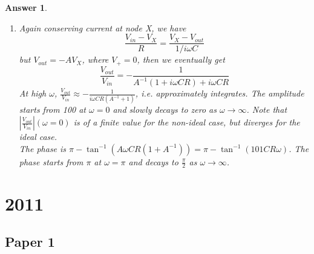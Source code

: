 \documentclass[a4paper]{article}
\newtheorem{ans}{Answer}[subsection]
\theoremstyle{new}
\begin{document}
\begin{ans}
\begin{enumerate}[label=(\roman*)]
\item Again conserving current at node X, we have 
$$\frac{V_{in}-V_X}{R}=\frac{V_X-V_{out}}{1/i\omega C}$$
but $V_{out}=-AV_X$, where $V_+=0$, then we eventually get 
$$\frac{V_{out}}{V_{in}}=-\frac{1}{A^{-1}(1+i\omega CR)+i\omega CR}$$
At high $\omega$, $\frac{V_{out}}{V_{in}}\approx-\frac{1}{i\omega CR(A^{-1}+1)}$, i.e. approximately integrates. The amplitude starts from 100 at $\omega=0$ and slowly decays to zero as $\omega\rightarrow\infty$. Note that $|\frac{V_{out}}{V_{in}}|(\omega=0)$ is of a finite value for the non-ideal case, but diverges for the ideal case.\\[5pt]
The phase is $\pi-\tan^{-1}(A\omega CR(1+A^{-1}))=\pi-\tan^{-1}(101CR\omega)$. The phase starts from $\pi$ at $\omega=\pi$ and decays to $\frac{\pi}{2}$ as $\omega\rightarrow\infty$.
\end{enumerate}
\end{ans}
\newpage
\section{2011}
\subsection{Paper 1}
\end{document}
